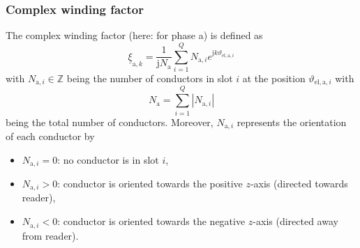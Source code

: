 \begin{frame}
	\frametitle{Complex winding factor}
	\onslide<+->
	The complex winding factor (here: for phase a) is defined as
	\begin{equation}
		\underline{\xi}_{\mathrm{a},k} = \frac{1}{\mathrm{j}N_\mathrm{a}}\sum_{i=1}^{Q} N_{\mathrm{a},i}e^{\mathrm{j}k\vartheta_{\mathrm{el},\mathrm{a},i}}
		\label{eq:Complex_winding_factor_definition}
	\end{equation}
	with $N_{\mathrm{a},i}\in \mathbb{Z}$ being the number of conductors in slot $i$ at the position $\vartheta_{\mathrm{el},\mathrm{a},i}$ \onslide<+-> with
	\begin{equation}
		N_\mathrm{a} = \sum_{i=1}^{Q} |N_{\mathrm{a},i}|
		\label{eq:Complex_winding_factor_total_number_conductors}
	\end{equation}
	being the total number of conductors. \onslide<+-> Moreover, $N_{\mathrm{a},i}$ represents the orientation of each conductor by
	\begin{itemize}
		\item $N_{\mathrm{a},i} = 0$: no conductor is in slot $i$,
		\item<+-> $N_{\mathrm{a},i} >0 $: conductor is oriented towards the positive $z$-axis (directed towards reader),
		\item<+-> $N_{\mathrm{a},i} <0 $: conductor is oriented towards the negative $z$-axis (directed away from reader).
	\end{itemize}
\end{frame}

